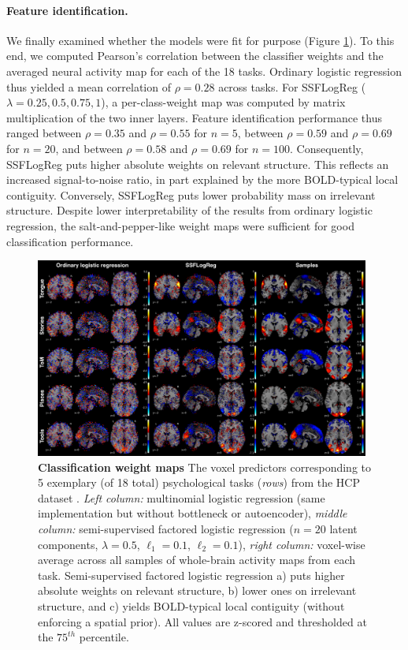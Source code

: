 \documentclass{article} %
\begin{document}
\paragraph{Feature identification.}
We finally examined whether the models
were fit for purpose
(Figure \ref{fig_weights}).
%
To this end, we computed Pearson's correlation between the classifier weights
and the averaged neural activity map for each of the 18 tasks.
%
Ordinary logistic regression thus yielded a mean correlation
of $\rho=0.28$ across tasks.
%
For SSFLogReg ($\lambda=0.25, 0.5, 0.75, 1$),
a per-class-weight map was computed by matrix
multiplication of the two inner layers.
Feature identification performance thus ranged
between $\rho=0.35$ and $\rho=0.55$ for $n=5$,
between $\rho=0.59$ and $\rho=0.69$ for $n=20$, and
between $\rho=0.58$ and $\rho=0.69$ for $n=100$.
%
Consequently,
SSFLogReg puts higher absolute weights on relevant structure.
This reflects an increased signal-to-noise ratio, in part explained
by the more BOLD-typical local contiguity.
%
Conversely, SSFLogReg puts lower probability mass on irrelevant structure.
Despite lower interpretability of the results from
ordinary logistic regression, the
salt-and-pepper-like weight maps were sufficient for
good classification performance.
%
\begin{figure}
\begin{centering}
\includegraphics[width=0.98\textwidth]{figures/figure_weights_perc75.png}
\end{centering}
\vspace{-0.1cm}
\caption{\textbf{Classification weight maps}
The voxel predictors corresponding to 5 exemplary
(of 18 total) psychological tasks (\textit{rows})
from the HCP dataset \cite{barch2013}.
\textit{Left column:} multinomial logistic regression (same
implementation but without bottleneck or autoencoder),
\textit{middle column:} semi-supervised factored logistic regression
($n=20$ latent components, $\lambda=0.5$, $\ell_1=0.1$, $\ell_2=0.1$),
\textit{right column:} voxel-wise average across all samples of whole-brain
activity maps from each task.
Semi-supervised factored logistic regression
a) puts higher absolute weights on relevant structure,
b) lower ones on irrelevant structure,
and
c) yields BOLD-typical local contiguity (without enforcing a spatial prior).
All values are z-scored and thresholded at the $75^{th}$ percentile.
}
\label{fig_weights}
\end{figure}
\end{document}
